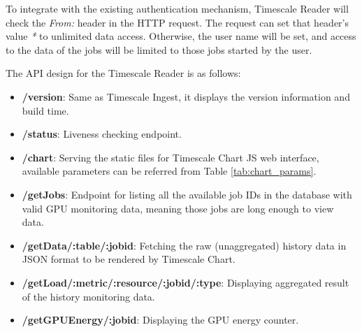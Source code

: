 To integrate with the existing authentication mechanism, Timescale Reader will check the \textit{From:} header in the HTTP request. The request can set that header's value \textit{*} to unlimited data access. Otherwise, the user name will be set, and access to the data of the jobs will be limited to those jobs started by the user.

The API design for the Timescale Reader is as follows:

\begin{itemize}
    \item \textbf{/version}: Same as Timescale Ingest, it displays the version information and build time.
    \item \textbf{/status}: Liveness checking endpoint.
    \item \textbf{/chart}: Serving the static files for Timescale Chart JS web interface, available parameters can be referred from Table \ref{tab:chart_params}.
    \item \textbf{/getJobs}: Endpoint for listing all the available job IDs in the database with valid GPU monitoring data, meaning those jobs are long enough to view data.
    \item \textbf{/getData/:table/:jobid}: Fetching the raw (unaggregated) history data in JSON format to be rendered by Timescale Chart.
    \item \textbf{/getLoad/:metric/:resource/:jobid/:type}: Displaying aggregated result of the history monitoring data.
    \item \textbf{/getGPUEnergy/:jobid}: Displaying the GPU energy counter.
\end{itemize}


